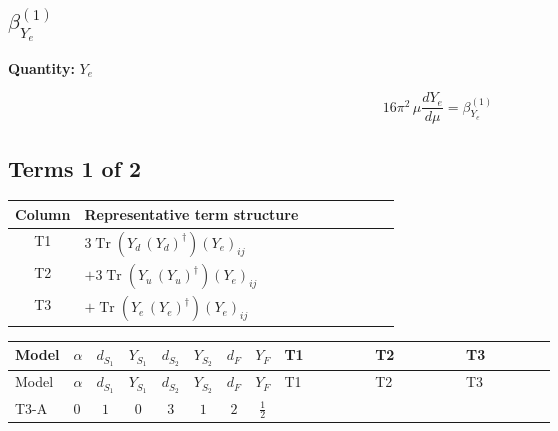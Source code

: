 \documentclass[8pt]{article}
\begin{document}
\begin{landscape}
\section*{$\beta_{Y_e}^{(1)}$}
\noindent\textbf{Quantity: }$Y_e$\par\smallskip
\[16\pi^2\,\mu\frac{d Y_e}{d\mu}=\beta_{Y_e}^{(1)}\]
\subsection*{Terms 1 of 2}
\begin{center}
\begin{tabular}{@{}c >{\raggedright\arraybackslash}p{0.82\linewidth}@{}}
\toprule
Column & Representative term structure \\
\midrule
T1 & \(\displaystyle 3 \operatorname{Tr}\!\left({Y_d}\,\left({Y_d}\right)^{\dagger}\right) \left({Y_e}\right)_{ij}\) \\
\midrule
T2 & \(\displaystyle +3 \operatorname{Tr}\!\left({Y_u}\,\left({Y_u}\right)^{\dagger}\right) \left({Y_e}\right)_{ij}\) \\
\midrule
T3 & \(\displaystyle +\operatorname{Tr}\!\left({Y_e}\,\left({Y_e}\right)^{\dagger}\right) \left({Y_e}\right)_{ij}\) \\
\midrule
\bottomrule
\end{tabular}
\end{center}
\smallskip
\tiny
\begin{longtable}{@{}llcccccc >{\raggedright\arraybackslash}p{0.21\linewidth} >{\raggedright\arraybackslash}p{0.21\linewidth} >{\raggedright\arraybackslash}p{0.21\linewidth}@{}}
\toprule
Model & $\alpha$ & $d_{S_1}$ & $Y_{S_1}$ & $d_{S_2}$ & $Y_{S_2}$ & $d_F$ & $Y_F$ & T1 & T2 & T3 \\
\midrule
\endfirsthead
\toprule
Model & $\alpha$ & $d_{S_1}$ & $Y_{S_1}$ & $d_{S_2}$ & $Y_{S_2}$ & $d_F$ & $Y_F$ & T1 & T2 & T3 \\
\midrule
\endhead
T3-A & $0$ & $1$ & $0$ & $3$ & $1$ & $2$ & $\frac{1}{2}$ & \scriptsize\adjustbox{max width=\linewidth}{$\begin{gathered} 3 \operatorname{Tr}\!\left({Y_d}\,\left({Y_d}\right)^{\dagger}\right) \left({Y_e}\right)_{ij}\end{gathered}$} & \scriptsize\adjustbox{max width=\linewidth}{$\begin{gathered} +3 \operatorname{Tr}\!\left({Y_u}\,\left({Y_u}\right)^{\dagger}\right) \left({Y_e}\right)_{ij}\end{gathered}$} & \scriptsize\adjustbox{max width=\linewidth}{$\begin{gathered} +\operatorname{Tr}\!\left({Y_e}\,\left({Y_e}\right)^{\dagger}\right) \left({Y_e}\right)_{ij}\end{gathered}$} \\

\end{longtable}
\end{landscape}
\end{document}
